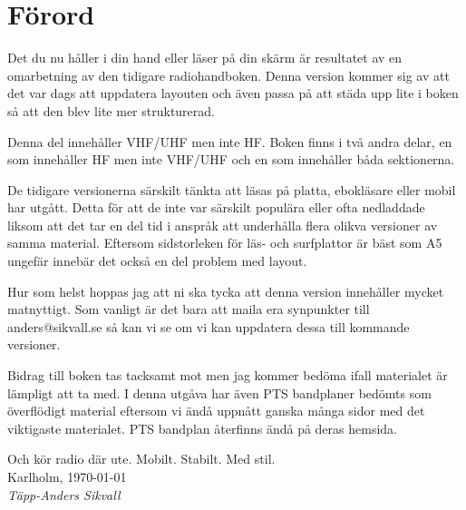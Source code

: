 \section*{Förord}
	
Det du nu håller i din hand eller läser på din skärm är resultatet av
en omarbetning av den tidigare radiohandboken. Denna version kommer
sig av att det var dags att uppdatera layouten och även passa på att
städa upp lite i boken så att den blev lite mer strukturerad.
	
Denna del innehåller VHF/UHF men inte HF. Boken finns i två andra
delar, en som innehåller HF men inte VHF/UHF och en som innehåller
båda sektionerna.
	
De tidigare versionerna särskilt tänkta att läsas på platta,
ebokläsare eller mobil har utgått. Detta för att de inte var särskilt
populära eller ofta nedladdade liksom att det tar en del tid i anspråk
att underhålla flera olikva versioner av samma material. Eftersom
sidstorleken för läs- och surfplattor är bäst som A5 ungefär innebär
det också en del problem med layout.
	
Hur som helst hoppas jag att ni ska tycka att denna version innehåller
mycket matnyttigt. Som vanligt är det bara att maila era synpunkter
till anders@sikvall.se så kan vi se om vi kan uppdatera dessa till
kommande versioner.
	
Bidrag till boken tas tacksamt mot men jag kommer bedöma ifall
materialet är lämpligt att ta med. I denna utgåva har även PTS
bandplaner bedömts som överflödigt material eftersom vi ändå uppnått
ganska många sidor med det viktigaste materialet. PTS bandplan
återfinns ändå på deras hemsida.
	
Och kör radio där ute. Mobilt. Stabilt. Med stil.\\[4em]
	
Karlholm, \today\\
\textit{Täpp-Anders Sikvall}

\clearpage
